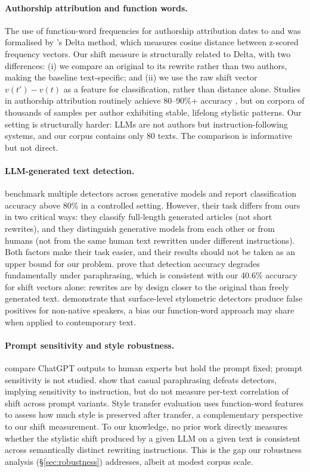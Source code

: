 \documentclass[11pt,a4paper]{article}
\begin{document}
\paragraph{Authorship attribution and function words.}
The use of function-word frequencies for authorship attribution
dates to \citet{mosteller1964} and was formalised by
\citet{burrows1987}'s Delta method, which measures cosine distance
between z-scored frequency vectors.
Our shift measure is structurally related to Delta, with two differences:
(i) we compare an original to its rewrite rather than two authors,
making the baseline text-specific; and
(ii) we use the raw shift vector $v(t') - v(t)$ as a feature for
classification, rather than distance alone.
Studies in authorship attribution routinely achieve 80--90\%+ accuracy
\citep{stamatatos2009,koppel2009}, but on corpora of thousands of
samples per author exhibiting stable, lifelong stylistic patterns.
Our setting is structurally harder: LLMs are not authors but
instruction-following systems, and our corpus contains only 80 texts.
The comparison is informative but not direct.

\paragraph{LLM-generated text detection.}
\citet{uchendu2023} benchmark multiple detectors across generative
models and report classification accuracy above 80\% in a controlled
setting.
However, their task differs from ours in two critical ways:
they classify full-length generated articles (not short rewrites),
and they distinguish generative models from each other or from humans
(not from the same human text rewritten under different instructions).
Both factors make their task easier, and their results should not
be taken as an upper bound for our problem.
\citet{sadasivan2023} prove that detection accuracy degrades
fundamentally under paraphrasing, which is consistent with our
40.6\% accuracy for shift vectors alone: rewrites are by design closer
to the original than freely generated text.
\citet{liang2024} demonstrate that surface-level stylometric detectors
produce false positives for non-native speakers, a bias our
function-word approach may share when applied to contemporary text.

\paragraph{Prompt sensitivity and style robustness.}
\citet{guo2023} compare ChatGPT outputs to human experts but hold
the prompt fixed; prompt sensitivity is not studied.
\citet{zhu2023} show that casual paraphrasing defeats detectors,
implying sensitivity to instruction, but do not measure per-text
correlation of shift across prompt variants.
Style transfer evaluation \citep{mir2019,tikhonov2019} uses
function-word features to assess how much style is preserved after
transfer, a complementary perspective to our shift measurement.
To our knowledge, no prior work directly measures whether the
stylistic shift produced by a given LLM on a given text is
consistent across semantically distinct rewriting instructions.
This is the gap our robustness analysis (\S\ref{sec:robustness})
addresses, albeit at modest corpus scale.
\end{document}
